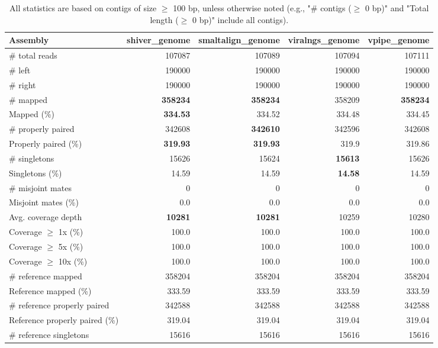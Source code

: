 \documentclass[12pt,a4paper]{article}
\begin{document}
\begin{table}[ht]
\begin{center}
\caption{All statistics are based on contigs of size $\geq$ 100 bp, unless otherwise noted (e.g., "\# contigs ($\geq$ 0 bp)" and "Total length ($\geq$ 0 bp)" include all contigs).}
\begin{tabular}{|l*{4}{|r}|}
\hline
Assembly & shiver\_genome & smaltalign\_genome & viralngs\_genome & vpipe\_genome \\ \hline
\# total reads & 107087 & 107089 & 107094 & 107111 \\ \hline
\# left & 190000 & 190000 & 190000 & 190000 \\ \hline
\# right & 190000 & 190000 & 190000 & 190000 \\ \hline
\# mapped & {\bf 358234} & {\bf 358234} & 358209 & {\bf 358234} \\ \hline
Mapped (\%) & {\bf 334.53} & 334.52 & 334.48 & 334.45 \\ \hline
\# properly paired & 342608 & {\bf 342610} & 342596 & 342608 \\ \hline
Properly paired (\%) & {\bf 319.93} & {\bf 319.93} & 319.9 & 319.86 \\ \hline
\# singletons & 15626 & 15624 & {\bf 15613} & 15626 \\ \hline
Singletons (\%) & 14.59 & 14.59 & {\bf 14.58} & 14.59 \\ \hline
\# misjoint mates & 0 & 0 & 0 & 0 \\ \hline
Misjoint mates (\%) & 0.0 & 0.0 & 0.0 & 0.0 \\ \hline
Avg. coverage depth & {\bf 10281} & {\bf 10281} & 10259 & 10280 \\ \hline
Coverage $\geq$ 1x (\%) & 100.0 & 100.0 & 100.0 & 100.0 \\ \hline
Coverage $\geq$ 5x (\%) & 100.0 & 100.0 & 100.0 & 100.0 \\ \hline
Coverage $\geq$ 10x (\%) & 100.0 & 100.0 & 100.0 & 100.0 \\ \hline
\# reference mapped & 358204 & 358204 & 358204 & 358204 \\ \hline
Reference mapped (\%) & 333.59 & 333.59 & 333.59 & 333.59 \\ \hline
\# reference properly paired & 342588 & 342588 & 342588 & 342588 \\ \hline
Reference properly paired (\%) & 319.04 & 319.04 & 319.04 & 319.04 \\ \hline
\# reference singletons & 15616 & 15616 & 15616 & 15616 \\ \hline

\end{tabular}
\end{center}
\end{table}
\end{document}
